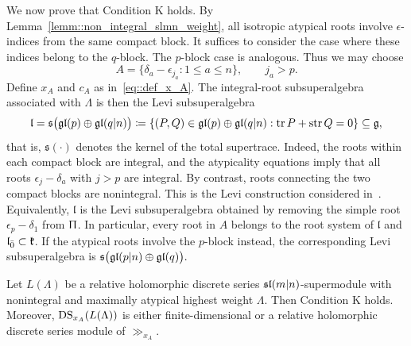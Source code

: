 We now prove that Condition K holds. By Lemma~\ref{lemm::non_integral_slmn_weight}, all isotropic atypical roots involve $\epsilon$-indices from the same compact block. It suffices to consider the case where these indices belong to the $q$-block. The $p$-block case is analogous. Thus we may choose
\begin{equation}
A=\{\delta_a-\epsilon_{j_a}:1\leq a\leq n\},
\qquad j_a>p.
\end{equation}
Define $x_{A}$ and $c_{A}$ as in~\eqref{eq::def_x_A}. The integral-root subsuperalgebra associated with $\Lambda$ is then the Levi subsuperalgebra
\begin{equation}
\mathfrak l
=
\mathfrak s\bigl(\gl(p)\oplus\gl(q\vert n)\bigr)
\coloneqq
\{(P,Q)\in\gl(p)\oplus\gl(q\vert n):\operatorname{tr}P+\str Q=0\}
\subseteq\gg,
\end{equation}
that is, $\mathfrak s(\cdot)$ denotes the kernel of the total supertrace.
Indeed, the roots within each compact block are integral, and the atypicality equations imply that all roots $\epsilon_j-\delta_a$ with $j>p$ are integral. By contrast, roots connecting the two compact blocks are nonintegral. This is the Levi construction considered in~\cite[Section~3.4]{chengMazorchukWang2013}. Equivalently, $\mathfrak l$ is the Levi subsuperalgebra obtained by removing the simple root $\epsilon_p-\delta_1$ from $\Uppi$. In particular, every root in $A$ belongs to the root system of $\mathfrak l$ and $\ll_{\bar{0}}\subset \kk$. If the atypical roots involve the $p$-block instead, the corresponding Levi subsuperalgebra is
$
\mathfrak s\bigl(\gl(p\vert n)\oplus\gl(q)\bigr).
$


\begin{proposition}
\label{prop::condition_K_slmn}
Let $L(\Lambda)$ be a relative holomorphic discrete series $\sl(m\vert n)$-supermodule with nonintegral and maximally atypical highest weight $\Lambda$. Then Condition K holds. Moreover, $\DS_{x_A}(L(\Lambda))$ is either finite-dimensional or a relative holomorphic discrete series module of $\gg_{x_{A}}$. 
\end{proposition}

